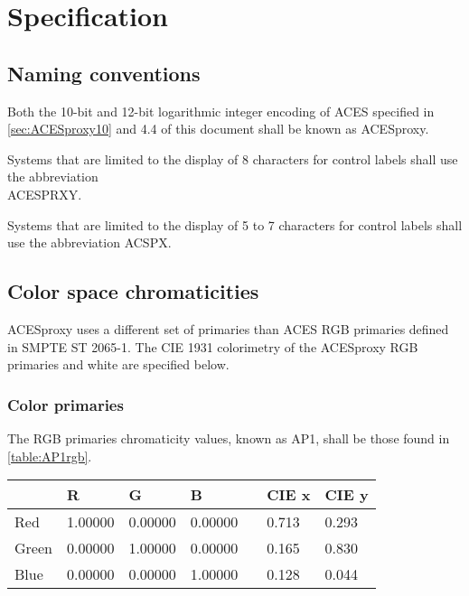 \regularsectionformat	%
\chapter{Specification}

\section{Naming conventions}
Both the 10-bit and 12-bit logarithmic integer encoding of ACES specified in \autoref{sec:ACESproxy10} and 4.4 of this document shall be known as ACESproxy.

Systems that are limited to the display of 8 characters for control labels shall use the abbreviation \\
ACESPRXY. 

Systems that are limited to the display of 5 to 7 characters for control labels shall use the abbreviation ACSPX.

\section{Color space chromaticities}
\label{sec:colorspace}
ACESproxy uses a different set of primaries than ACES RGB primaries defined in SMPTE ST 2065-1. The CIE 1931 colorimetry of the ACESproxy RGB primaries and white are specified below.

\subsection{Color primaries}
The RGB primaries chromaticity values, known as AP1, shall be those found in \autoref{table:AP1rgb}.

\begin{center}
\begin{tabularx}{4.5in}{XlllXll}
        & R       & G       & B       & & CIE x & CIE y \\ \hline
Red     & 1.00000 & 0.00000 & 0.00000 & & 0.713 & 0.293 \\
Green   & 0.00000 & 1.00000 & 0.00000 & & 0.165 & 0.830 \\
Blue    & 0.00000 & 0.00000 & 1.00000 & & 0.128 & 0.044 \\
\end{tabularx}
\label{table:AP1rgb}
\end{center}

